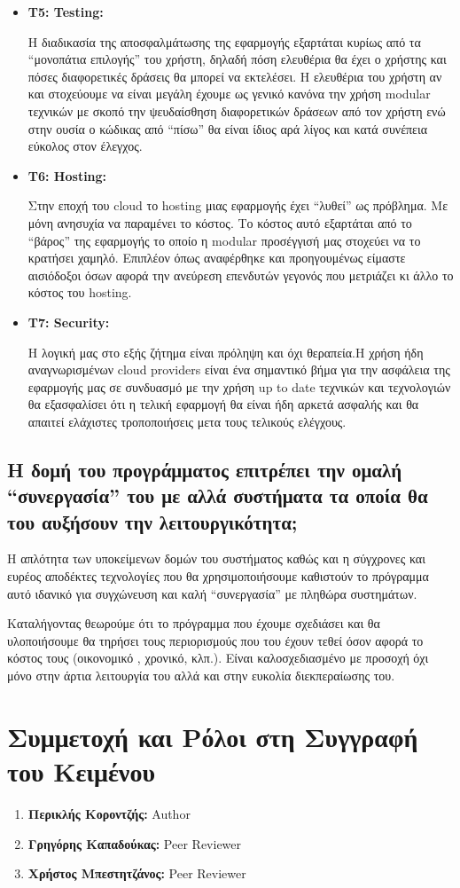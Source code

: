 \documentclass[12pt,a4paper]{article}
\begin{document}
\begin{itemize}
	\item \textbf{Τ5: Testing:}

	Η διαδικασία της αποσφαλμάτωσης της εφαρμογής εξαρτάται κυρίως από τα “μονοπάτια επιλογής” του χρήστη, δηλαδή πόση ελευθέρια θα έχει ο χρήστης και πόσες διαφορετικές δράσεις θα μπορεί να εκτελέσει. Η ελευθέρια του χρήστη αν και στοχεύουμε να είναι μεγάλη έχουμε ως γενικό κανόνα την χρήση modular τεχνικών με σκοπό την ψευδαίσθηση διαφορετικών δράσεων από τον χρήστη ενώ στην ουσία ο κώδικας από “πίσω” θα είναι ίδιος αρά λίγος και κατά συνέπεια εύκολος στον έλεγχος.

	\item \textbf{Τ6: Hosting:}

	Στην εποχή του cloud το hosting μιας εφαρμογής έχει “λυθεί” ως πρόβλημα. Με μόνη ανησυχία να παραμένει το κόστος. Το κόστος αυτό εξαρτάται από το “βάρος” της εφαρμογής το οποίο η modular προσέγγισή μας στοχεύει να το κρατήσει χαμηλό. Επιπλέον όπως αναφέρθηκε και προηγουμένως είμαστε αισιόδοξοι όσων αφορά την ανεύρεση επενδυτών γεγονός που μετριάζει κι άλλο το κόστος του hosting.

	\item \textbf{T7: Security:}

	Η λογική μας στο εξής ζήτημα είναι πρόληψη και όχι θεραπεία.H χρήση ήδη αναγνωρισμένων cloud providers είναι ένα σημαντικό βήμα για την ασφάλεια της εφαρμογής μας σε συνδυασμό με την χρήση up to date τεχνικών και τεχνολογιών θα εξασφαλίσει ότι η τελική εφαρμογή θα είναι ήδη αρκετά ασφαλής και θα απαιτεί ελάχιστες τροποποιήσεις μετα τους τελικούς ελέγχους.
\end{itemize}

\subsection{Η δομή του προγράμματος επιτρέπει την ομαλή “συνεργασία” του με αλλά συστήματα τα οποία θα του αυξήσουν την λειτουργικότητα;}

Η απλότητα των υποκείμενων δομών του συστήματος καθώς και η σύγχρονες και ευρέος αποδέκτες τεχνολογίες που θα χρησιμοποιήσουμε καθιστούν το πρόγραμμα αυτό ιδανικό για συγχώνευση και καλή “συνεργασία” με πληθώρα συστημάτων.

Καταλήγοντας θεωρούμε ότι το πρόγραμμα που έχουμε σχεδιάσει και θα υλοποιήσουμε θα τηρήσει τους περιορισμούς που του έχουν τεθεί όσον αφορά το κόστος τους (οικονομικό , χρονικό, κλπ.). Είναι καλοσχεδιασμένο με προσοχή όχι μόνο στην άρτια λειτουργία του αλλά και στην ευκολία διεκπεραίωσης του.

\section{Συμμετοχή και Ρόλοι στη Συγγραφή του Κειμένου}
\begin{enumerate}
	\item \textbf{Περικλής Κοροντζής:} Author
	\item \textbf{Γρηγόρης Καπαδούκας:} Peer Reviewer
	\item \textbf{Χρήστος Μπεστητζάνος:} Peer Reviewer
\end{enumerate}
\end{document}
